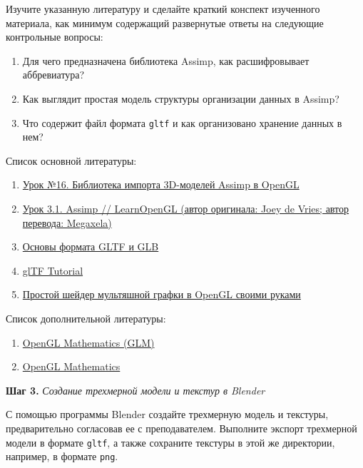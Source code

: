 \documentclass[a4paper,12pt]{article}
\begin{document}
    Изучите указанную литературу и сделайте краткий конспект изученного материала, как минимум содержащий развернутые ответы на следующие контрольные вопросы:
    
    \begin{enumerate}
        \item Для чего предназначена библиотека Assimp, как расшифровывает аббревиатура?
        \item Как выглядит простая модель структуры организации данных в Assimp?
        \item Что содержит файл формата \texttt{gltf} и как организовано хранение данных в нем?
    \end{enumerate}
    
    Список основной литературы:
    \begin{enumerate}
        \item \href{https://ravesli.com/urok-16-biblioteka-importa-3d-modelej-assimp-v-opengl/}{Урок №16. Библиотека импорта 3D-моделей Assimp в OpenGL}
        \item \href{https://habr.com/ru/post/338436/}{Урок 3.1. Assimp // LearnOpenGL (автор оригинала: Joey de Vries; автор перевода: Megaxela)}
        \item \href{https://habr.com/ru/articles/448220/}{Основы формата GLTF и GLB}
        \item \href{https://github.com/KhronosGroup/glTF-Tutorials/blob/main/gltfTutorial/README.md}{glTF Tutorial}
        \item \href{https://habr.com/ru/post/505726/}{Простой шейдер мультяшной графки в OpenGL своими руками}
    \end{enumerate}
    
    Список дополнительной литературы:
    \begin{enumerate}
        \item \href{http://www.c-jump.com/bcc/common/Talk3/Math/GLM/GLM.html#W01_0030_matrix_transformation}{OpenGL Mathematics (GLM)}
        \item \href{https://glm.g-truc.net/0.9.2/api/a00001.html}{OpenGL Mathematics}
    \end{enumerate}
    
    \textbf{Шаг 3.} \textit{Создание трехмерной модели и текстур в Blender}
    
    С помощью программы Blender создайте трехмерную модель и текстуры, предварительно согласовав ее с преподавателем. Выполните экспорт трехмерной модели в формате \texttt{gltf}, а также сохраните текстуры в этой же директории, например, в формате \texttt{png}.
    
\end{document}
